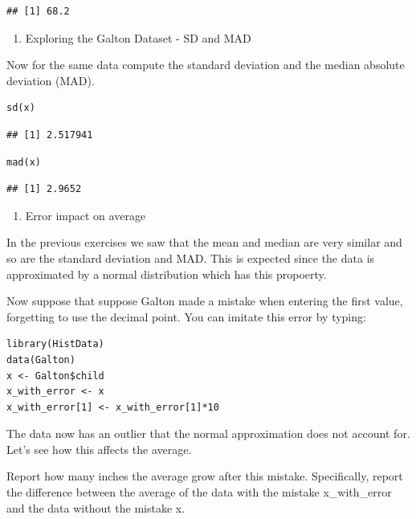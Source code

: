 \documentclass[
]{article}
\providecommand{\tightlist}{%
  \setlength{\itemsep}{0pt}\setlength{\parskip}{0pt}}
\begin{document}
\begin{verbatim}
## [1] 68.2
\end{verbatim}

\begin{enumerate}
\def\labelenumi{\arabic{enumi}.}
\setcounter{enumi}{1}
\tightlist
\item
  Exploring the Galton Dataset - SD and MAD
\end{enumerate}

Now for the same data compute the standard deviation and the median
absolute deviation (MAD).

\begin{verbatim}
sd(x)
\end{verbatim}

\begin{verbatim}
## [1] 2.517941
\end{verbatim}

\begin{verbatim}
mad(x)
\end{verbatim}

\begin{verbatim}
## [1] 2.9652
\end{verbatim}

\begin{enumerate}
\def\labelenumi{\arabic{enumi}.}
\setcounter{enumi}{2}
\tightlist
\item
  Error impact on average
\end{enumerate}

In the previous exercises we saw that the mean and median are very
similar and so are the standard deviation and MAD. This is expected
since the data is approximated by a normal distribution which has this
propoerty.

Now suppose that suppose Galton made a mistake when entering the first
value, forgetting to use the decimal point. You can imitate this error
by typing:

\begin{verbatim}
library(HistData)
data(Galton)
x <- Galton$child
x_with_error <- x
x_with_error[1] <- x_with_error[1]*10
\end{verbatim}

The data now has an outlier that the normal approximation does not
account for. Let's see how this affects the average.

Report how many inches the average grow after this mistake.
Specifically, report the difference between the average of the data with
the mistake x\_with\_error and the data without the mistake x.
\end{document}
